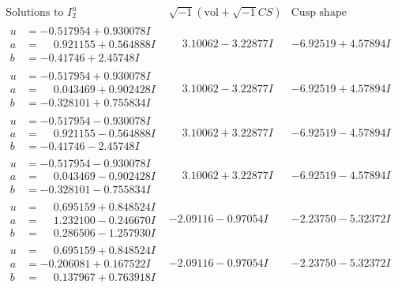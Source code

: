 \documentclass[1p]{elsarticle_modified}
\theoremstyle{definition}
\newcommand{\I}{\sqrt{-1}}
\begin{document}
$$\begin{array}{c|c|c}  
\text{Solutions to }I^u_{2}& \I (\text{vol} + \sqrt{-1}CS) & \text{Cusp shape}\\
 \hline 
\begin{aligned}
u &= -0.517954 + 0.930078 I \\
a &= \phantom{-}0.921155 + 0.564888 I \\
b &= -0.41746 + 2.45748 I\end{aligned}
 & \phantom{-}3.10062 - 3.22877 I & -6.92519 + 4.57894 I \\ \hline\begin{aligned}
u &= -0.517954 + 0.930078 I \\
a &= \phantom{-}0.043469 + 0.902428 I \\
b &= -0.328101 + 0.755834 I\end{aligned}
 & \phantom{-}3.10062 - 3.22877 I & -6.92519 + 4.57894 I \\ \hline\begin{aligned}
u &= -0.517954 - 0.930078 I \\
a &= \phantom{-}0.921155 - 0.564888 I \\
b &= -0.41746 - 2.45748 I\end{aligned}
 & \phantom{-}3.10062 + 3.22877 I & -6.92519 - 4.57894 I \\ \hline\begin{aligned}
u &= -0.517954 - 0.930078 I \\
a &= \phantom{-}0.043469 - 0.902428 I \\
b &= -0.328101 - 0.755834 I\end{aligned}
 & \phantom{-}3.10062 + 3.22877 I & -6.92519 - 4.57894 I \\ \hline\begin{aligned}
u &= \phantom{-}0.695159 + 0.848524 I \\
a &= \phantom{-}1.232100 - 0.246670 I \\
b &= \phantom{-}0.286506 - 1.257930 I\end{aligned}
 & -2.09116 - 0.97054 I & -2.23750 - 5.32372 I \\ \hline\begin{aligned}
u &= \phantom{-}0.695159 + 0.848524 I \\
a &= -0.206081 + 0.167522 I \\
b &= \phantom{-}0.137967 + 0.763918 I\end{aligned}
 & -2.09116 - 0.97054 I & -2.23750 - 5.32372 I \\ \hline\begin{aligned}

\end{aligned}
\end{array}$$
\end{document}
